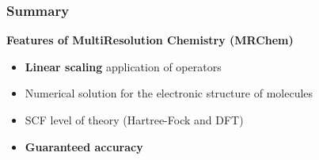 \begin{frame}
    \frametitle{Summary}
    \textbf{Features of MultiResolution Chemistry (MRChem)}
    \begin{itemize}
        \item   \textbf{Linear scaling} application of operators
        \item   Numerical solution for the electronic structure of molecules
        \item   SCF level of theory (Hartree-Fock and DFT)
        \item   \textbf{Guaranteed accuracy}

\end{itemize}
\end{frame}

